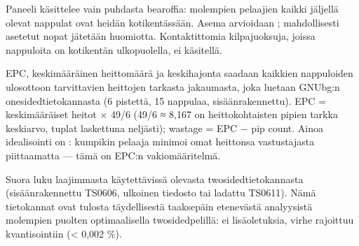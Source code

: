 \documentclass[letterpaper,10pt,finnish]{sphinxmanual}
\begin{document}
\sphinxAtStartPar
{} Paneeli käsittelee vain puhdasta bearoffia: molempien pelaajien kaikki jäljellä olevat nappulat ovat heidän kotikentässään. Asema arvioidaan ; mahdollisesti asetetut nopat jätetään huomiotta. Kontaktittomia kilpajuoksuja, joissa nappuloita on kotikentän ulkopuolella, ei käsitellä.

\sphinxAtStartPar
{} EPC, keskimääräinen heittomäärä ja keskihajonta saadaan kaikkien nappuloiden ulosottoon tarvittavien heittojen tarkasta jakaumasta, joka luetaan GNUbg:n one\sphinxhyphen{}sided\sphinxhyphen{}tietokannasta (6 pistettä, 15 nappulaa, sisäänrakennettu). EPC = keskimääräiset heitot × 49/6 (49/6 ≈ 8,167 on heittokohtaisten pipien tarkka keskiarvo, tuplat laskettuna neljästi); wastage = EPC − pip count. Ainoa idealisointi on : kumpikin pelaaja minimoi omat heittonsa vastustajasta piittaamatta — tämä on EPC:n vakiomääritelmä.

\sphinxAtStartPar
{} Suora luku laajimmasta käytettävissä olevasta two\sphinxhyphen{}sided\sphinxhyphen{}tietokannasta (sisäänrakennettu TS\sphinxhyphen{}06\sphinxhyphen{}06, ulkoinen tiedosto tai ladattu TS\sphinxhyphen{}06\sphinxhyphen{}11). Nämä tietokannat ovat tulosta täydellisestä taaksepäin etenevästä analyysistä molempien puolten optimaalisella two\sphinxhyphen{}sided\sphinxhyphen{}pelillä: ei lisäoletuksia, virhe rajoittuu kvantisointiin (< 0,002 \%).
\end{document}
